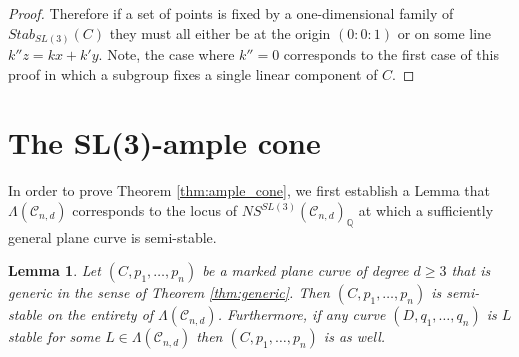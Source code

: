 \documentclass{amsart}
\newcommand{\Q}{\mathbb{Q}}
\newcommand{\mc}{\mathcal}
\numberwithin{equation}{section}
\newtheorem{lemma}[prop]{Lemma}
\theoremstyle{definition}
\begin{document}
\begin{proof}
Therefore if a set of points is fixed by a one-dimensional family of $Stab_{SL(3)}(C)$ they must all either be at the origin $(0:0:1)$ or on some line $k''z= kx+k'y$. Note, the case where $k''=0$ corresponds to the first case of this proof in which a subgroup fixes a single linear component of $C$. 
    
\end{proof}




\section{ The SL(3)-ample cone} \label{subsec:outerwalls}

In order to prove Theorem \ref{thm:ample_cone}, we first establish a Lemma that $\Lambda(\mc{C}_{n,d})$ corresponds to the locus of $NS^{SL(3)}(\mc{C}_{n,d})_\Q$ at which a sufficiently general plane curve is semi-stable.


\begin{lemma}\label{lemma:semistable_generic}
    Let $(C, p_1 , \dots , p_n)$ be a marked plane curve of degree $d \geq 3$ that is generic in the sense of Theorem \ref{thm:generic}. Then $(C, p_1 , \dots , p_n)$ is semi-stable on the entirety of $\Lambda(\mc{C}_{n,d})$. Furthermore, if any curve $(D, q_1, \dots, q_n)$ is $L$ stable for some $L \in \Lambda(\mc{C}_{n,d})$ then $(C, p_1 , \dots , p_n)$ is as well.
\end{lemma}
\end{document}
